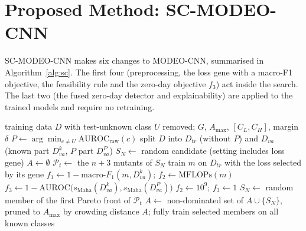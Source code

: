 \documentclass[10pt,twocolumn,letterpaper]{article}
\begin{document}
\section{Proposed Method: SC-MODEO-CNN}\label{sec:method}

SC-MODEO-CNN makes six changes to MODEO-CNN, summarised in
Algorithm~\ref{alg:sc}. The first four (preprocessing, the loss gene with
a macro-F1 objective, the feasibility rule and the zero-day objective
$f_3$) act inside the search. The last two (the fused zero-day detector
and explainability) are applied to the trained models and require no
retraining.

\begin{algorithm}[t]
\caption{SC-MODEO-CNN search (changes to MODEO-CNN marked $\triangleright$)}\label{alg:sc}
\begin{algorithmic}[1]
\Require training data $D$ with test-unknown class $U$ removed; $G$, $A_{\max}$, $[C_L, C_H]$, margin $\delta$
\State $P \gets \arg\min_{c \neq U} \mathrm{AUROC}_{\mathrm{raw}}(c)$ 
\State split $D$ into $D_{tr}$ (without $P$) and $D_{va}$ (known part $D_{va}^{k}$, $P$ part $D_{va}^{P}$)
\State $S_N \gets$ random candidate (setting includes loss gene) \Comment{$\triangleright$}
\State $A \gets \emptyset$
  \State $\mathcal{P}_t \gets$ the $n+3$ mutants of $S_N$
    \State train $m$ on $D_{tr}$ with the loss selected by its gene \Comment{$\triangleright$}
    \State $f_1 \gets 1 - \text{macro-}F_1(m, D_{va}^{k})$; $f_2 \gets \mathrm{MFLOPs}(m)$ \Comment{$\triangleright$}
    \State $f_3 \gets 1 - \mathrm{AUROC}\big(s_{\mathrm{Maha}}(D_{va}^{k}), s_{\mathrm{Maha}}(D_{va}^{P})\big)$ \Comment{$\triangleright$}
     $f_2 \gets 10^{9}$; $f_3 \gets 1$ \Comment{$\triangleright$}
    \EndIf
  \EndFor
  \State $S_N \gets$ random member of the first Pareto front of $\mathcal{P}_t$
  \State $A \gets$ non-dominated set of $A \cup \{S_N\}$, pruned to $A_{\max}$ by crowding distance
\EndFor
\State \Return $A$; fully train selected members on all known classes
\end{algorithmic}
\end{algorithm}
\end{document}
